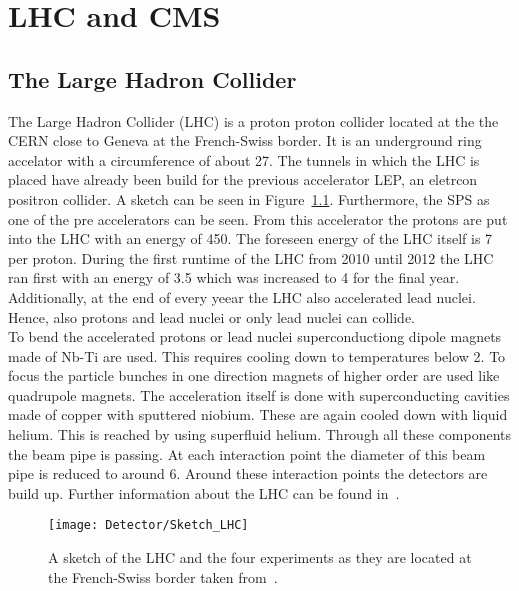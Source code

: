 \chapter{LHC and CMS \label{sec:LHCCMS}}

\section{The Large Hadron Collider \label{LHCCMSLHC}}

The Large Hadron Collider (LHC) is a proton proton collider located at the the CERN close to Geneva at the French-Swiss border. It is an underground ring accelator with a circumference of about 27\km{}. The tunnels in which the LHC is placed have already been build for the previous accelerator LEP, an eletrcon positron collider. A sketch can be seen in Figure~\ref{plot:LCHSketch}. Furthermore, the SPS as one of the pre accelerators can be seen. From this accelerator the protons are put into the LHC with an energy of 450\GeV{}. The foreseen energy of the LHC itself is 7\TeV{} per proton. During the first runtime of the LHC from 2010 until 2012 the LHC ran first with an energy of 3.5\TeV{} which was increased to 4\TeV{} for the final year. Additionally, at the end of every yeear the LHC also accelerated lead nuclei. Hence, also protons and lead nuclei or only lead nuclei can collide. \\
To bend the accelerated protons or lead nuclei superconductiong dipole magnets made of Nb-Ti are used. This requires cooling down to temperatures below 2\K{}. To focus the particle bunches in one direction magnets of higher order are used like quadrupole magnets. The acceleration itself is done with superconducting cavities made of copper with sputtered niobium. These are again cooled down with liquid helium.  This is reached by using superfluid helium. Through all these components the beam pipe is passing. At each interaction point the diameter of this beam pipe is reduced to around 6\cm{}. Around these interaction points the detectors are build up. Further information about the LHC can be found in~.

\begin{figure}[!ht]
  \centering
  \texttt{[image: Detector/Sketch\_LHC]}
  \caption[Sketch of the LHC]{A sketch of the LHC and the four experiments as they are located at the French-Swiss border taken from~\cite{Team:40525}. \label{plot:LCHSketch}}
\end{figure}

